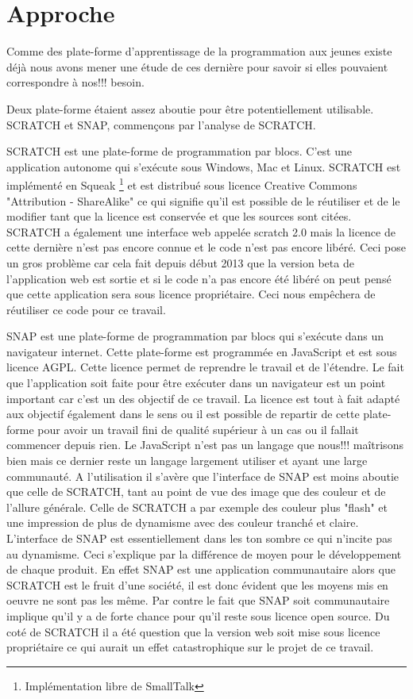 \section{Approche}
\label{intro-approche}
Comme des plate-forme d'apprentissage de la programmation aux jeunes existe déjà nous avons mener une étude de ces dernière pour savoir si elles pouvaient correspondre à nos!!! besoin.

Deux plate-forme étaient assez aboutie pour être potentiellement utilisable. SCRATCH et SNAP, commençons par l'analyse de SCRATCH.

SCRATCH est une plate-forme de programmation par blocs. C'est une application autonome qui s'exécute sous Windows, Mac et Linux. SCRATCH est implémenté en Squeak \footnote{Implémentation libre de SmallTalk} et est distribué sous licence Creative Commons "Attribution - ShareAlike" ce qui signifie qu'il est possible de le réutiliser et de le modifier tant que la licence est conservée et que les sources sont citées. SCRATCH a également une interface web appelée scratch 2.0 mais la licence de cette dernière n'est pas encore connue et le code n'est pas encore libéré. Ceci pose un gros problème car cela fait depuis début 2013 que la version beta de l'application web est sortie et si le code n'a pas encore été libéré on peut pensé que cette application sera sous licence propriétaire. Ceci nous empêchera de réutiliser ce code pour ce travail.

SNAP est une plate-forme de programmation par blocs qui s’exécute dans un navigateur internet. Cette plate-forme est programmée en JavaScript et est sous licence AGPL. Cette licence permet de reprendre le travail et de l'étendre. Le fait que l'application soit faite pour être exécuter dans un navigateur est un point important car c'est un des objectif de ce travail. La licence est tout à fait adapté aux objectif également dans le sens ou il est possible de repartir de cette plate-forme pour avoir un travail fini de qualité supérieur à un cas ou il fallait commencer depuis rien. Le JavaScript n'est pas un langage que nous!!! maîtrisons bien mais ce dernier reste un langage largement utiliser et ayant une large communauté.
A l'utilisation il s'avère que l'interface de SNAP est moins aboutie que celle de SCRATCH, tant au point de vue des image que des couleur et de l'allure générale. Celle de SCRATCH a par exemple des couleur plus "flash" et une impression de plus de dynamisme avec des couleur tranché et claire. L'interface de SNAP est essentiellement dans les ton sombre ce qui n'incite pas au dynamisme. Ceci s'explique par la différence de moyen pour le développement de chaque produit. En effet SNAP est une application communautaire alors que SCRATCH est le fruit d'une société, il est donc évident que les moyens mis en oeuvre ne sont pas les même. Par contre le fait que SNAP soit communautaire implique qu'il y a de forte chance pour qu'il reste sous licence open source. Du coté de SCRATCH il a été question que la version web soit mise sous licence propriétaire ce qui aurait un effet catastrophique sur le projet de ce travail.


